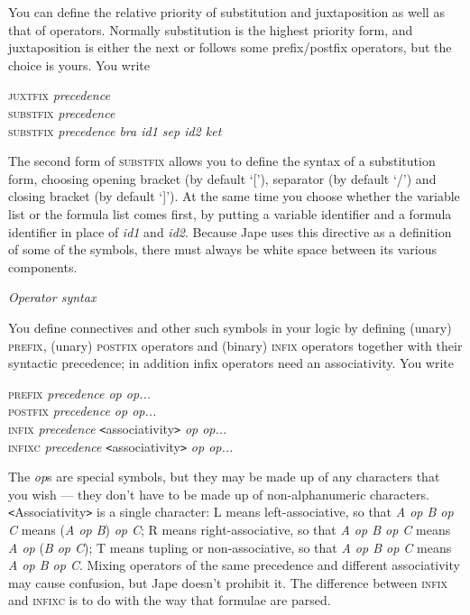 You can define the relative priority of substitution and juxtaposition as well as that of operators. Normally substitution is the highest priority form, and juxtaposition is either the next or follows some prefix/postfix operators, but the choice is yours. You write

\textsc{juxtfix} \textit{precedence}\\
\textsc{substfix} \textit{precedence}\\
\textsc{substfix} \textit{precedence bra id1 sep id2 ket}


The second form of \textsc{substfix} allows you to define the syntax of a substitution form, choosing opening bracket (by default `['), separator (by default `/') and closing bracket (by default `]'). At the same time you choose whether the variable list or the formula list comes first, by putting a variable identifier and a formula identifier in place of \textit{id1} and \textit{id2}. Because Jape uses this directive as a definition of some of the symbols, there must always be white space between its various components.


\textit{Operator syntax}


You define connectives and other such symbols in your logic by defining (unary) \textsc{prefix}, (unary) \textsc{postfix} operators and (binary) \textsc{infix} operators together with their syntactic precedence; in addition infix operators need an associativity. You write

\textsc{prefix} \textit{precedence op op...}\\
\textsc{postfix} \textit{precedence op op...}\\
\textsc{infix} \textit{precedence} \texttt{<}associativity\texttt{>} \textit{op op...}\\
\textsc{infixc} \textit{precedence} \texttt{<}associativity\texttt{>} \textit{op op...}


The \textit{op}s are special symbols, but they may be made up of any characters that you wish --- they don't have to be made up of non-alphanumeric characters. \texttt{<}Associativity\texttt{>} is a single character: L means left-associative, so that \textit{A op B op C} means (\textit{A op B}) \textit{op C}; R means right-associative, so that \textit{A op B op C} means \textit{A op} (\textit{B op C}); T means tupling or non-associative, so that \textit{A op B op C} means \textit{A op B op C}. Mixing operators of the same precedence and different associativity may cause confusion, but Jape doesn't prohibit it. The difference between \textsc{infix} and \textsc{infixc} is to do with the way that formulae are parsed.


